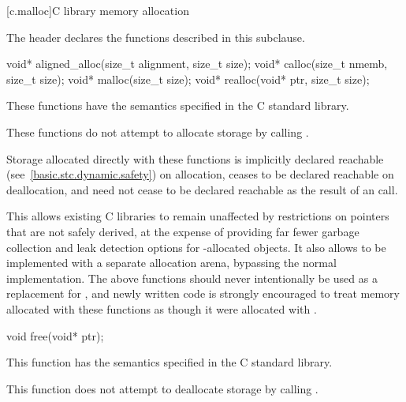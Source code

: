 [c.malloc]{C library memory allocation}

\pnum
\begin{note}
The header 
declares the functions described in this subclause.
\end{note}

%
%
%
%
\begin{itemdecl}
void* aligned_alloc(size_t alignment, size_t size);
void* calloc(size_t nmemb, size_t size);
void* malloc(size_t size);
void* realloc(void* ptr, size_t size);
\end{itemdecl}

\begin{itemdescr}
\pnum
\effects
These functions have the semantics specified in the C standard library.

\pnum
\remarks
These functions do not attempt to allocate
storage by calling .
%

\pnum
Storage allocated directly with these functions
is implicitly declared reachable
(see~\ref{basic.stc.dynamic.safety}) on allocation, ceases to be declared
reachable on deallocation, and need not cease to be declared reachable as the
result of an  call.
\begin{note}
This allows existing
C libraries to remain unaffected by restrictions on pointers that are not safely
derived, at the expense of providing far fewer garbage collection and leak
detection options for -allocated objects. It also allows
 to be implemented with a separate allocation arena, bypassing
the normal  implementation. The above functions
should never intentionally be used as a replacement for
, and newly written code is strongly encouraged to
treat memory allocated with these functions as though it were allocated with
.
\end{note}
\end{itemdescr}

%
\begin{itemdecl}
void free(void* ptr);
\end{itemdecl}

\begin{itemdescr}
\pnum
\effects
This function has the semantics specified in the C standard library.

\pnum
\remarks
This function does not attempt to
deallocate storage by calling
.
\end{itemdescr}

